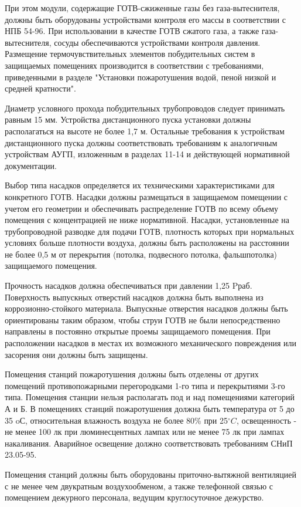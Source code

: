 При этом модули, содержащие ГОТВ-сжиженные газы без газа-вытеснителя, должны быть оборудованы устройствами контроля его массы в
соответствии с НПБ 54-96. При использовании в качестве ГОТВ сжатого газа, а также газа-вытеснителя, сосуды обеспечиваются
устройствами контроля давления.
Размещение термочувствительных элементов побудительных систем в защищаемых помещениях производится в соответствии с
требованиями, приведенными в разделе "Установки пожаротушения водой, пеной низкой и средней кратности".

Диаметр условного прохода побудительных трубопроводов следует принимать равным 15 мм. Устройства дистанционного пуска
установки должны располагаться на высоте не более 1,7 м.
Остальные требования к устройствам дистанционного пуска должны соответствовать требованиям к аналогичным устройствам АУГП,
изложенным в разделах 11-14 и действующей нормативной документации.

Выбор типа насадков определяется их техническими характеристиками для конкретного ГОТВ.
Насадки должны размещаться в защищаемом помещении с учетом его геометрии и обеспечивать распределение ГОТВ по всему
объему помещения с концентрацией не ниже нормативной.
Насадки, установленные на трубопроводной разводке для подачи ГОТВ, плотность которых при нормальных условиях больше плотности
воздуха, должны быть расположены на расстоянии не более 0,5 м от перекрытия (потолка, подвесного потолка, фальшпотолка)
защищаемого помещения.

Прочность насадков должна обеспечиваться при давлении 1,25 Pраб. Поверхность выпускных отверстий насадков должна быть выполнена
из коррозионно-стойкого материала. Выпускные отверстия насадков должны быть ориентированы таким образом, чтобы струи ГОТВ не
были непосредственно направлены в постоянно открытые проемы защищаемого помещения. При расположении насадков в местах их
возможного механического повреждения или засорения они должны быть защищены.

Помещения станций пожаротушения должны быть отделены от других помещений противопожарными перегородками 1-го типа и перекрытиями
3-го типа. Помещения станции нельзя располагать под и над помещениями категорий А и Б. В помещениях станций пожаротушения
должна быть температура от 5 до 35 oС, относительная влажность воздуха не более 80\% при 25$^\circ{C}$, освещенность - не
менее 100 лк при люминесцентных лампах или не менее 75 лк при лампах накаливания. Аварийное освещение должно соответствовать
требованиям СНиП 23.05-95.

Помещения станций должны быть оборудованы приточно-вытяжной вентиляцией с не менее чем двукратным воздухообменом, а также
телефонной связью с помещением дежурного персонала, ведущим круглосуточное дежурство.

